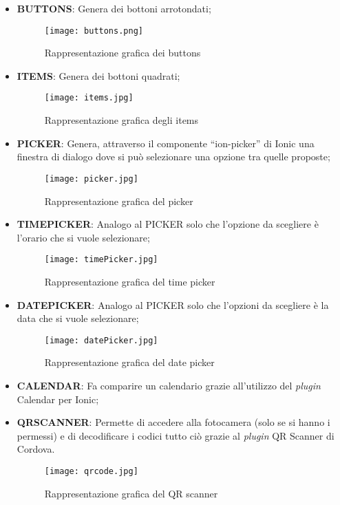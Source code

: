 \begin{itemize}
	\item \textbf{BUTTONS}: Genera dei bottoni arrotondati;
	\begin{figure}[h]
		\centering
		\texttt{[image: buttons.png]}
	\caption{Rappresentazione grafica dei buttons}
	\end{figure}
	\clearpage
	\item \textbf{ITEMS}: Genera dei bottoni quadrati;
	\begin{figure}[h]
		\centering
		\texttt{[image: items.jpg]}
		\caption{Rappresentazione grafica degli items}
	\end{figure}
	\item \textbf{PICKER}: Genera, attraverso il componente “ion-picker” di \textsf{Ionic} una finestra di dialogo dove si può selezionare una opzione tra quelle proposte;
	\begin{figure}[h]
		\centering
		\texttt{[image: picker.jpg]}
		\caption{Rappresentazione grafica del picker}
	\end{figure}
	\item \textbf{TIMEPICKER}: Analogo al PICKER solo che l'opzione da scegliere è l'orario che si vuole selezionare;
	\begin{figure}[h]
		\centering
		\texttt{[image: timePicker.jpg]}
		\caption{Rappresentazione grafica del time picker}\label{fig:time}
	\end{figure}
\clearpage
	\item \textbf{DATEPICKER}: Analogo al PICKER solo che l'opzioni da scegliere è la data che si vuole selezionare;
	\begin{figure}[h]
		\centering
		\texttt{[image: datePicker.jpg]}
		\caption{Rappresentazione grafica del date picker}\label{fig:date}
	\end{figure}
	\item \textbf{CALENDAR}: Fa comparire un calendario grazie all'utilizzo del \emph{plugin} Calendar per Ionic;
	\item \textbf{QRSCANNER}: Permette di accedere alla fotocamera (solo se si hanno i permessi) e di decodificare i codici  tutto ciò grazie al \emph{plugin} QR Scanner di Cordova.
	\begin{figure}[h]
		\centering
		\texttt{[image: qrcode.jpg]}
		\caption{Rappresentazione grafica del QR scanner}\label{fig:qrc}
	\end{figure}
\end{itemize}

